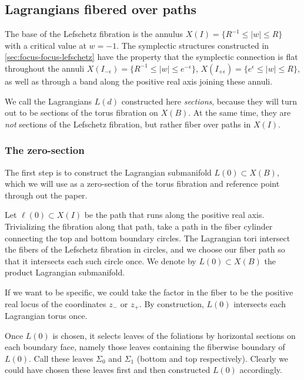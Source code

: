 \documentclass[12pt]{amsart}
\begin{document}
\subsection{Lagrangians fibered over paths}
\label{sec:lags-construction}

The base of the Lefschetz fibration is the annulus $X(I) = \{R^{-1}
\leq |w| \leq R\}$ with a critical value at $w = -1$. The symplectic
structures constructed in \ref{sec:focus-focus-lefschetz} have the
property that the symplectic connection is flat throughout the annuli
$X(I_{-\epsilon}) = \{R^{-1} \leq |w| \leq e^{-\epsilon}\}$,
$X(I_{+\epsilon}) = \{e^\epsilon \leq |w| \leq R\}$, as well as
through a band along the positive real axis joining these annuli.

We call the Lagrangians $L(d)$ constructed here \emph{sections}, because they will turn out to be sections of the torus fibration on $X(B)$. At the same time, they are \emph{not} sections of the Lefschetz fibration, but rather fiber over paths in $X(I)$.

\subsubsection{The zero-section}
\label{sec:zero-section}

The first step is to construct the Lagrangian submanifold $L(0)
\subset X(B)$, which we will use as a zero-section of the torus fibration and reference point
through out the paper. 


\begin{definition}
  Let  $\ell(0) \subset X(I)$ be the path that runs along
the positive real axis. Trivializing the fibration along that path, take a path in the fiber cylinder connecting the top and bottom boundary circles. The Lagrangian tori intersect the fibers of the Lefschetz fibration in circles, and we choose our fiber path so that it intersects each such circle once. We denote by $L(0) \subset X(B)$ the product Lagrangian submanifold. 
\end{definition}
If we want to be specific, we could take the
factor in the fiber to be the positive real locus of the coordinates
$z_-$ or $z_+$. By construction, $L(0)$ intersects each Lagrangian torus once.

Once $L(0)$ is chosen, it selects leaves of the foliations by horizontal sections on each
boundary face, namely those leaves containing the fiberwise boundary of $L(0)$. Call these
leaves $\Sigma_0$ and $\Sigma_1$ (bottom and top
respectively). Clearly we could have chosen these leaves first and
then constructed $L(0)$ accordingly.
\end{document}
